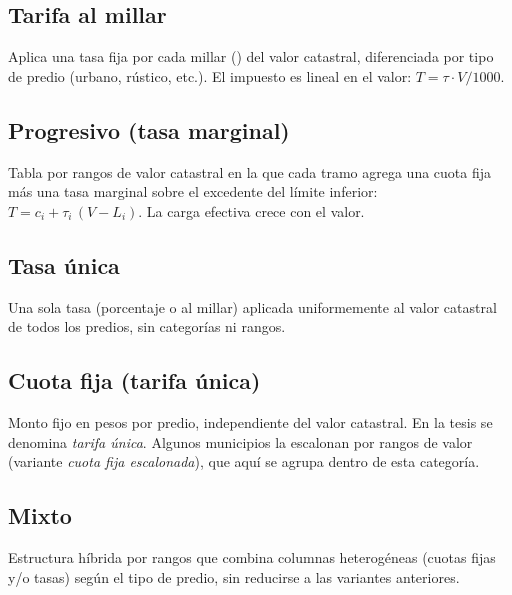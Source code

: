 
\subsection*{Tarifa al millar}
Aplica una tasa fija por cada millar (\textperthousand) del valor catastral, diferenciada por tipo de predio (urbano, rústico, etc.). El impuesto es lineal en el valor: $T = \tau \cdot V / 1000$.


\subsection*{Progresivo (tasa marginal)}
Tabla por rangos de valor catastral en la que cada tramo agrega una cuota fija más una tasa marginal sobre el excedente del límite inferior: $T = c_i + \tau_i\,(V - L_i)$. La carga efectiva crece con el valor.


\subsection*{Tasa única}
Una sola tasa (porcentaje o al millar) aplicada uniformemente al valor catastral de todos los predios, sin categorías ni rangos.


\subsection*{Cuota fija (tarifa única)}
Monto fijo en pesos por predio, independiente del valor catastral. En la tesis se denomina \emph{tarifa única}. Algunos municipios la escalonan por rangos de valor (variante \emph{cuota fija escalonada}), que aquí se agrupa dentro de esta categoría.


\subsection*{Mixto}
Estructura híbrida por rangos que combina columnas heterogéneas (cuotas fijas y/o tasas) según el tipo de predio, sin reducirse a las variantes anteriores.


